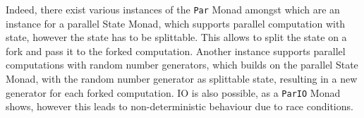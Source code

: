 Indeed, there exist various instances of the \texttt{Par} Monad amongst which are an instance for a parallel State Monad, which supports parallel computation with state, however the state has to be splittable. This allows to split the state on a fork and pass it to the forked computation. Another instance supports parallel computations with random number generators, which builds on the parallel State Monad, with the random number generator as splittable state, resulting in a new generator for each forked computation. IO is also possible, as a \texttt{ParIO} Monad shows, however this leads to non-deterministic behaviour due to race conditions.